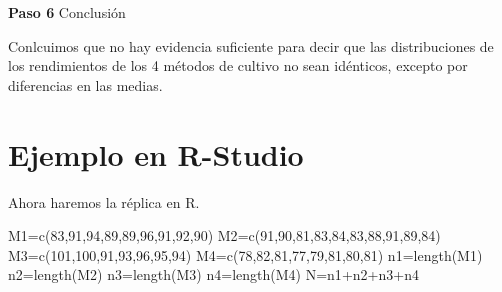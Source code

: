 \documentclass[
  a4paper,
  oneside,
  openany]{book}
\newenvironment{Shaded}{\begin{snugshade}}{\end{snugshade}}
\newcommand{\DecValTok}[1]{\textcolor[rgb]{0.00,0.00,0.81}{#1}}
\newcommand{\FunctionTok}[1]{\textcolor[rgb]{0.00,0.00,0.00}{#1}}
\newcommand{\NormalTok}[1]{#1}
\newcommand{\OtherTok}[1]{\textcolor[rgb]{0.56,0.35,0.01}{#1}}
\newcommand{\SpecialCharTok}[1]{\textcolor[rgb]{0.00,0.00,0.00}{#1}}
\begin{document}
\textbf{Paso 6} Conclusión

Conlcuimos que no hay evidencia suficiente para decir que las distribuciones de los rendimientos de los 4 métodos de cultivo no sean idénticos, excepto por diferencias en las medias.

\hypertarget{ejemplo-en-r-studio-8}{%
\section{Ejemplo en R-Studio}\label{ejemplo-en-r-studio-8}}

Ahora haremos la réplica en R.

\begin{Shaded}
\begin{Highlighting}[]
\NormalTok{M1}\OtherTok{=}\FunctionTok{c}\NormalTok{(}\DecValTok{83}\NormalTok{,}\DecValTok{91}\NormalTok{,}\DecValTok{94}\NormalTok{,}\DecValTok{89}\NormalTok{,}\DecValTok{89}\NormalTok{,}\DecValTok{96}\NormalTok{,}\DecValTok{91}\NormalTok{,}\DecValTok{92}\NormalTok{,}\DecValTok{90}\NormalTok{)}
\NormalTok{M2}\OtherTok{=}\FunctionTok{c}\NormalTok{(}\DecValTok{91}\NormalTok{,}\DecValTok{90}\NormalTok{,}\DecValTok{81}\NormalTok{,}\DecValTok{83}\NormalTok{,}\DecValTok{84}\NormalTok{,}\DecValTok{83}\NormalTok{,}\DecValTok{88}\NormalTok{,}\DecValTok{91}\NormalTok{,}\DecValTok{89}\NormalTok{,}\DecValTok{84}\NormalTok{)}
\NormalTok{M3}\OtherTok{=}\FunctionTok{c}\NormalTok{(}\DecValTok{101}\NormalTok{,}\DecValTok{100}\NormalTok{,}\DecValTok{91}\NormalTok{,}\DecValTok{93}\NormalTok{,}\DecValTok{96}\NormalTok{,}\DecValTok{95}\NormalTok{,}\DecValTok{94}\NormalTok{)}
\NormalTok{M4}\OtherTok{=}\FunctionTok{c}\NormalTok{(}\DecValTok{78}\NormalTok{,}\DecValTok{82}\NormalTok{,}\DecValTok{81}\NormalTok{,}\DecValTok{77}\NormalTok{,}\DecValTok{79}\NormalTok{,}\DecValTok{81}\NormalTok{,}\DecValTok{80}\NormalTok{,}\DecValTok{81}\NormalTok{)}
\NormalTok{n1}\OtherTok{=}\FunctionTok{length}\NormalTok{(M1)}
\NormalTok{n2}\OtherTok{=}\FunctionTok{length}\NormalTok{(M2)}
\NormalTok{n3}\OtherTok{=}\FunctionTok{length}\NormalTok{(M3)}
\NormalTok{n4}\OtherTok{=}\FunctionTok{length}\NormalTok{(M4)}
\NormalTok{N}\OtherTok{=}\NormalTok{n1}\SpecialCharTok{+}\NormalTok{n2}\SpecialCharTok{+}\NormalTok{n3}\SpecialCharTok{+}\NormalTok{n4}


\end{Highlighting}
\end{Shaded}
\end{document}
